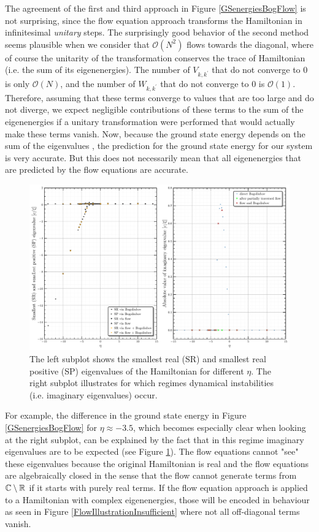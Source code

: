 The agreement of the first and third approach in Figure \ref{GSenergiesBogFlow} is not surprising, since the flow equation approach transforms the Hamiltonian in infinitesimal \emph{unitary} steps. The surprisingly good behavior of the second method seems plausible when we consider that $\mathcal O(N^2)$ flows towards the diagonal, where of course the unitarity of the transformation conserves the trace of Hamiltonian (i.e. the sum of its eigenenergies). The number of $V_{k,k^\prime}$ that do not converge to 0 is only $\mathcal O(N)$, and the number of $W_{k,k^\prime}$ that do not converge to 0 is $\mathcal O(1)$. Therefore, assuming that these terms converge to values that are too large and do not diverge, we expect negligible contributions of these terms to the sum of the eigenenergies if a unitary transformation were performed that would actually make these terms vanish. Now, because the ground state energy depends on the sum of the eigenvalues \cite{PracticalTraining}, the prediction for the ground state energy for our system is very accurate. But this does not necessarily mean that all eigenenergies that are predicted by the flow equations are accurate. 
\begin{figure}[H]
    \centering
    \includegraphics[width=\textwidth]{figures/plots/PDF/spectrum_analysis_bog_flow_comp.pdf}
    \caption[Characteristic eigenenergies of the Bose Polaron for different $\eta$]{The left subplot shows the smallest real (SR) and smallest real positive (SP) eigenvalues of the Hamiltonian for different $\eta$. The right subplot illustrates for which regimes dynamical instabilities (i.e. imaginary eigenvalues) occur.
}
    \label{SpectrumAnalysis}
\end{figure}
For example, the difference in the ground state energy in Figure \ref{GSenergiesBogFlow} for $\eta\approx -3.5$, which becomes especially clear when looking at the right subplot, can be explained by the fact that in this regime imaginary eigenvalues are to be expected (see Figure \ref{SpectrumAnalysis}). The flow equations cannot "see" these eigenvalues because the original Hamiltonian is real and the flow equations are algebraically closed in the sense that the flow cannot generate terms from $\mathbb{C}\setminus \mathbb{R}$ if it starts with purely real terms. If the flow equation approach is applied to a Hamiltonian with complex eigenenergies, those will be encoded in behaviour as seen in Figure \ref{FlowIllustrationInsufficient} where not all off-diagonal terms vanish. \\
